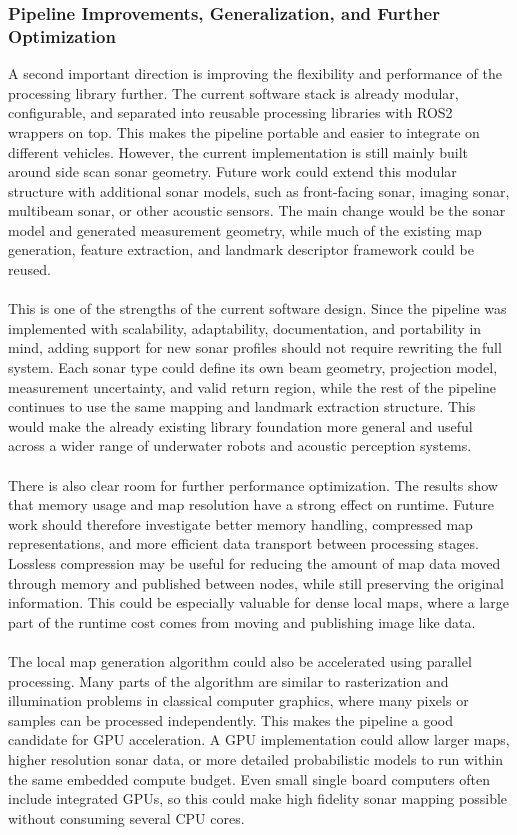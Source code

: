 \subsubsection{Pipeline Improvements, Generalization, and Further Optimization}
A second important direction is improving the flexibility and performance of the processing library further. The current software stack is already modular, configurable, and separated into reusable processing libraries with ROS2 wrappers on top. This makes the pipeline portable and easier to integrate on different vehicles. However, the current implementation is still mainly built around side scan sonar geometry. Future work could extend this modular structure with additional sonar models, such as front-facing sonar, imaging sonar, multibeam sonar, or other acoustic sensors. The main change would be the sonar model and generated measurement geometry, while much of the existing map generation, feature extraction, and landmark descriptor framework could be reused.
\\ \\
This is one of the strengths of the current software design. Since the pipeline was implemented with scalability, adaptability, documentation, and portability in mind, adding support for new sonar profiles should not require rewriting the full system. Each sonar type could define its own beam geometry, projection model, measurement uncertainty, and valid return region, while the rest of the pipeline continues to use the same mapping and landmark extraction structure. This would make the already existing library foundation more general and useful across a wider range of underwater robots and acoustic perception systems.
\\ \\
There is also clear room for further performance optimization. The results show that memory usage and map resolution have a strong effect on runtime. Future work should therefore investigate better memory handling, compressed map representations, and more efficient data transport between processing stages. Lossless compression may be useful for reducing the amount of map data moved through memory and published between nodes, while still preserving the original information. This could be especially valuable for dense local maps, where a large part of the runtime cost comes from moving and publishing image like data.
\\ \\
The local map generation algorithm could also be accelerated using parallel processing. Many parts of the algorithm are similar to rasterization and illumination problems in classical computer graphics, where many pixels or samples can be processed independently. This makes the pipeline a good candidate for GPU acceleration. A GPU implementation could allow larger maps, higher resolution sonar data, or more detailed probabilistic models to run within the same embedded compute budget. Even small single board computers often include integrated GPUs, so this could make high fidelity sonar mapping possible without consuming several CPU cores.

